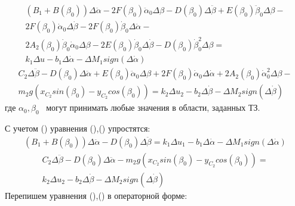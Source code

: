 \begin{equation}
\label{eq:p3:55}
\begin{multlined}
\left( B_{1}+B \left( \beta _{0} \right) \right) \Delta \ddot \alpha -
2F \left( \beta _{0} \right)\ddot \alpha _{0} \Delta \beta -
D \left( \beta _{0} \right) \Delta \ddot \beta +
E \left( \beta _{0} \right) \ddot \beta _{0} \Delta \beta -\\
2F \left( \beta _{0} \right) \dot \alpha _{0} \Delta \dot \beta -
2F \left( \beta _{0} \right) \dot \beta _{0} \Delta \dot \alpha -\\
2A_{2} \left( \beta _{0} \right) \dot \beta _{0} \dot \alpha _{0} \Delta \beta -
2E \left( \beta _{0} \right) \dot \beta _{0} \Delta \dot \beta -
D \left( \beta _{0} \right) \dot \beta _{0}^{2} \Delta \beta =\\
k_{1} \Delta u-
b_{1} \Delta \dot \alpha - \Delta M_{1}sign \left( \Delta \dot \alpha \right)
\end{multlined}
\end{equation}
\begin{equation}
\label{eq:p3:56}
\begin{multlined}
C_{2} \Delta \ddot \beta -
D \left( \beta _{0} \right) \Delta \ddot \alpha +
E \left( \beta _{0} \right) \ddot \alpha _{0} \Delta \beta +
2F \left( \beta _{0} \right) \dot \alpha _{0} \Delta \dot \alpha +
2A_{2} \left( \beta _{0} \right) \dot \alpha _{0}^{2} \Delta \beta -\\
m_{2}g \left( 
x_{C_{2}}sin \left( \beta _{0} \right) -
y_{C_{2}}cos \left( \beta _{0} \right) 
\right) =
k_{2} \Delta u_{2}-
b_{2} \Delta \dot \beta - 
\Delta M_{2}sign \left( \Delta \dot \beta \right) 
\end{multlined}
\end{equation}
где \( \alpha _{0}, \beta _{0} \) \ могут принимать любые значения в области, заданных ТЗ. 

С учетом () уравнения (),() упростятся: 
\begin{equation}
\label{eq:p3:57}
\begin{multlined}
\left( B_{1}+B \left( \beta _{0} \right) \right) \Delta \ddot \alpha -
D \left( \beta _{0} \right) \Delta \ddot \beta 
=
k_{1} \Delta u_{1} -
b_{1} \Delta \dot \alpha - 
\Delta M_{1}sign \left( \Delta \dot \alpha \right) 
\end{multlined}
\end{equation}
\begin{equation}
\label{eq:p3:58}
\begin{multlined}
C_{2} \Delta \ddot \beta -
D \left( \beta _{0} \right) \Delta \ddot \alpha -
m_{2}g \left( x_{C_{2}}sin \left( \beta _{0} \right) -
y_{C_{2}}cos \left( \beta _{0} \right) \right) 
=\\
k_{2} \Delta u_{2}-
b_{2} \Delta \dot \beta - 
\Delta M_{2}sign \left( \Delta \dot \beta \right) 
\end{multlined}
\end{equation}
Перепишем уравнения (),() в операторной форме: 


